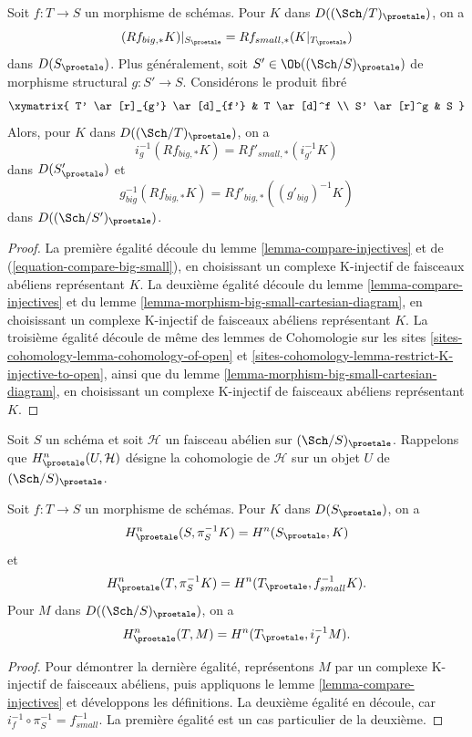 \begin{lemma}
\label{lemma-compare-higher-direct-image}
Soit $f : T \to S$ un morphisme de schémas.
Pour $K$ dans $D((\Sch/T)_\proetale)$, on a
$$
(Rf_{big, *}K)|_{S_\proetale} = Rf_{small, *}(K|_{T_\proetale})
$$
dans $D(S_\proetale)$. Plus généralement, soit $S' \in \Ob((\Sch/S)_\proetale)$
de morphisme structural $g : S' \to S$. Considérons le produit fibré
$$
\xymatrix{
T' \ar[r]_{g'} \ar[d]_{f'} & T \ar[d]^f \\
S' \ar[r]^g & S
}
$$
Alors, pour $K$ dans $D((\Sch/T)_\proetale)$, on a
$$
i_g^{-1}(Rf_{big, *}K) = Rf'_{small, *}(i_{g'}^{-1}K)
$$
dans $D(S'_\proetale)$ et
$$
g_{big}^{-1}(Rf_{big, *}K) = Rf'_{big, *}((g'_{big})^{-1}K)
$$
dans $D((\Sch/S')_\proetale)$.
\end{lemma}

\begin{proof}
La première égalité découle du lemme \ref{lemma-compare-injectives}
et de (\ref{equation-compare-big-small}),
en choisissant un complexe K-injectif de faisceaux abéliens représentant $K$.
La deuxième égalité découle du lemme \ref{lemma-compare-injectives}
et du lemme
\ref{lemma-morphism-big-small-cartesian-diagram},
en choisissant un complexe K-injectif de faisceaux abéliens représentant $K$.
La troisième égalité découle de même des
lemmes de Cohomologie sur les sites \ref{sites-cohomology-lemma-cohomology-of-open} et
\ref{sites-cohomology-lemma-restrict-K-injective-to-open},
ainsi que du lemme \ref{lemma-morphism-big-small-cartesian-diagram},
en choisissant un complexe K-injectif de faisceaux abéliens représentant $K$.
\end{proof}

\noindent
Soit $S$ un schéma et soit $\mathcal{H}$ un faisceau abélien sur
$(\Sch/S)_\proetale$. Rappelons que $H^n_\proetale(U, \mathcal{H})$ désigne
la cohomologie de $\mathcal{H}$ sur un objet $U$ de $(\Sch/S)_\proetale$.

\begin{lemma}
\label{lemma-compare-cohomology-big-small}
Soit $f : T \to S$ un morphisme de schémas. Pour $K$ dans $D(S_\proetale)$,
on a
$$
H^n_\proetale(S, \pi_S^{-1}K) = H^n(S_\proetale, K)
$$
et
$$
H^n_\proetale(T, \pi_S^{-1}K) = H^n(T_\proetale, f_{small}^{-1}K).
$$
Pour $M$ dans $D((\Sch/S)_\proetale)$, on a
$$
H^n_\proetale(T, M) = H^n(T_\proetale, i_f^{-1}M).
$$
\end{lemma}

\begin{proof}
Pour démontrer la dernière égalité, représentons $M$
par un complexe K-injectif de faisceaux abéliens,
puis appliquons le lemme \ref{lemma-compare-injectives}
et développons les définitions. La deuxième égalité en découle,
car $i_f^{-1} \circ \pi_S^{-1} = f_{small}^{-1}$. La première
égalité est un cas particulier
de la deuxième.
\end{proof}

